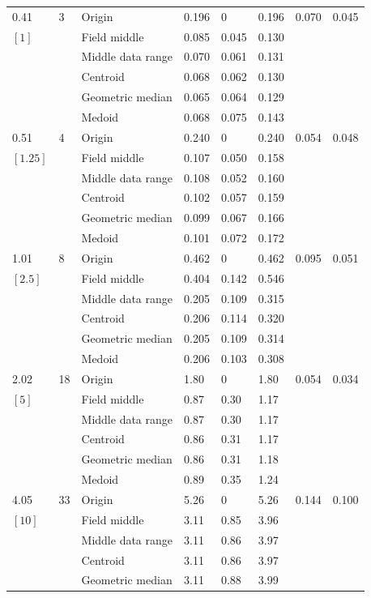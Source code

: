 \documentclass[phd,showgrids]{ndsu-thesis-2022}
\begin{document}
{{\begin{ThreePartTable}
\begin{longtable}{lll lll ll}
0.41 & 3 & Origin  & 0.196 & 0 & 0.196 & 0.070 & 0.045 \\
$[1]$ &  & Field middle  & 0.085 & 0.045 & 0.130 \\
 &  & Middle data range  & 0.070 & 0.061 & 0.131 \\
 &  & Centroid & 0.068 & 0.062 & 0.130 \\
 &  & Geometric median & 0.065 & 0.064 & 0.129 \\
 &  & Medoid  & 0.068 & 0.075 & 0.143 \\
\midrule
0.51 & 4 & Origin  & 0.240 & 0 & 0.240 & 0.054 & 0.048 \\
$[1.25]$ &  & Field middle  & 0.107 & 0.050 & 0.158 \\
 &  & Middle data range  & 0.108 & 0.052 & 0.160 \\
 &  & Centroid & 0.102 & 0.057 & 0.159 \\
 &  & Geometric median & 0.099 & 0.067 & 0.166 \\
 &  & Medoid  & 0.101 & 0.072 & 0.172 \\
\midrule
1.01 & 8 & Origin  & 0.462 & 0 & 0.462 & 0.095 & 0.051 \\
$[2.5]$ &  & Field middle  & 0.404 & 0.142 & 0.546 \\
 &  & Middle data range  & 0.205 & 0.109 & 0.315 \\
 &  & Centroid & 0.206 & 0.114 & 0.320 \\
 &  & Geometric median & 0.205 & 0.109 & 0.314 \\
 &  & Medoid  & 0.206 & 0.103 & 0.308 \\
\midrule
2.02 & 18 & Origin  & 1.80 & 0 & 1.80 & 0.054 & 0.034 \\
$[5]$ &  & Field middle  & 0.87 & 0.30 & 1.17 \\
 &  & Middle data range  & 0.87 & 0.30 & 1.17 \\
 &  & Centroid & 0.86 & 0.31 & 1.17 \\
 &  & Geometric median & 0.86 & 0.31 & 1.18 \\
 &  & Medoid  & 0.89 & 0.35 & 1.24 \\
\midrule
4.05 & 33 & Origin  & 5.26 & 0 & 5.26 & 0.144 & 0.100 \\
$[10]$ &  & Field middle  & 3.11 & 0.85 & 3.96 \\
 &  & Middle data range  & 3.11 & 0.86 & 3.97 \\
 &  & Centroid & 3.11 & 0.86 & 3.97 \\
 &  & Geometric median & 3.11 & 0.88 & 3.99 \\

\end{longtable}
\end{ThreePartTable}}}
\end{document}
